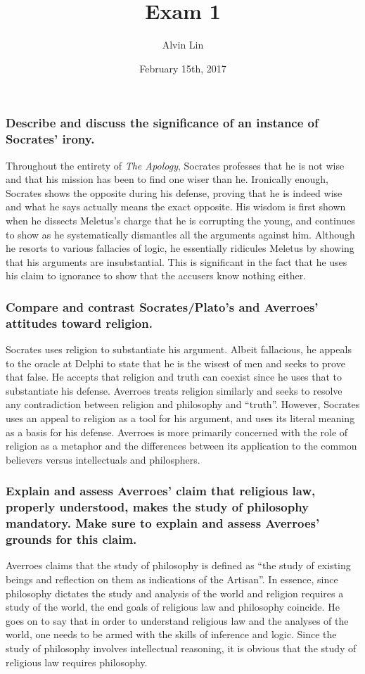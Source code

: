 \documentclass{article}
\title{Exam 1}
\author{Alvin Lin}
\date{February 15th, 2017}
\begin{document}
\maketitle

\subsubsection*{Describe and discuss the significance of an instance of
Socrates' irony.}
Throughout the entirety of \textit{The Apology}, Socrates professes that he is not wise and that his mission has been to find one wiser than he. Ironically enough, Socrates shows the opposite during his defense, proving that he is indeed wise and what he says actually means the exact opposite. His wisdom is first shown when he dissects Meletus's charge that he is corrupting the young, and continues to show as he systematically dismantles all the arguments against him. Although he resorts to various fallacies of logic, he essentially ridicules Meletus by showing that his arguments are insubstantial. This is significant in the fact that he uses his claim to ignorance to show that the accusers know nothing either.

\subsubsection*{Compare and contrast Socrates/Plato's and Averroes' attitudes
toward religion.}
Socrates uses religion to substantiate his argument. Albeit fallacious, he appeals to the oracle at Delphi to state that he is the wisest of men and seeks to prove that false. He accepts that religion and truth can coexist since he uses that to substantiate his defense. Averroes treats religion similarly and seeks to resolve any contradiction between religion and philosophy and ``truth''. However, Socrates uses an appeal to religion as a tool for his argument, and uses its literal meaning as a basis for his defense. Averroes is more primarily concerned with the role of religion as a metaphor and the differences between its application to the common believers versus intellectuals and philosphers.

\subsubsection*{Explain and assess Averroes' claim that religious law, properly
understood, makes the study of philosophy mandatory. Make sure to explain and
assess Averroes' grounds for this claim.}
Averroes claims that the study of philosophy is defined as ``the study of existing beings and reflection on them as indications of the Artisan''. In essence, since philosophy dictates the study and analysis of the world and religion requires a study of the world, the end goals of religious law and philosophy coincide. He goes on to say that in order to understand religious law and the analyses of the world, one needs to be armed with the skills of inference and logic. Since the study of philosophy involves intellectual reasoning, it is obvious that the study of religious law requires philosophy.
\end{document}
